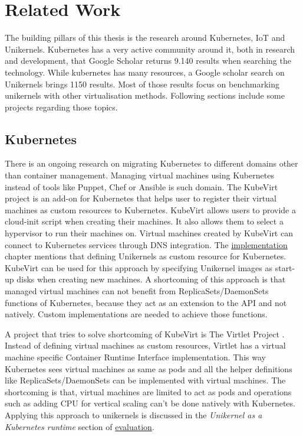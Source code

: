 
\chapter{Related Work}\label{chapter:literature}
The building pillars of this thesis is the research around Kubernetes, IoT and Unikernels. Kubernetes has a very active community around it, both in research and development, that Google Scholar returns 9.140 results when searching the technology. While kubernetes has many resources, a Google scholar search on Unikernels brings 1150 results. Most of those results focus on benchmarking unikernels with other virtualisation methods. Following sections include some projects regarding those topics.

\section*{Kubernetes}
There is an ongoing research on migrating Kubernetes to different domains other than container management. Managing virtual machines using Kubernetes instead of tools like Puppet, Chef or Ansible is such domain. The KubeVirt project \cite{kubevirt} is an add-on for Kubernetes that helps user to register their virtual machines as custom resources to Kubernetes. KubeVirt allows users to provide a cloud-init script when creating their machines. It also allows them to select a hypervisor to run their machines on. Virtual machines created by KubeVirt can connect to Kubernetes services through DNS integration. The \hyperref[chapter:implementation]{implementation} chapter mentions that defining Unikernels as custom resource for Kubernetes. KubeVirt can be used for this approach by specifying Unikernel images as start-up disks when creating new machines. A shortcoming of this approach is that managed virtual machines can not benefit from ReplicaSets/DaemonSets functions of Kubernetes, because they act as an extension to the API and not natively. Custom implementations are needed to achieve those functions.

A project that tries to solve shortcoming of KubeVirt is The Virtlet Project \cite{virtlet}. Instead of defining virtual machines as custom resources, Virtlet has a virtual machine specific Container Runtime Interface implementation. This way Kubernetes sees virtual machines as same as pods and all the helper definitions like ReplicaSets/DaemonSets can be implemented with virtual machines. The shortcoming is that, virtual machines are limited to act as pods and operations such as adding CPU for vertical scaling can't be done natively with Kubernetes. Applying this approach to unikernels is discussed in the \textit{Unikernel as a Kubernetes runtime} section of \hyperref[chapter:evaluation]{evaluation}.

